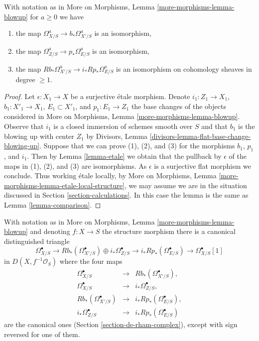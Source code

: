 \begin{lemma}
\label{lemma-comparison-general}
With notation as in More on Morphisms, Lemma \ref{more-morphisms-lemma-blowup}
for $a \geq 0$ we have
\begin{enumerate}
\item the map
$\Omega^a_{X/S} \to b_*\Omega^a_{X'/S}$ is an isomorphism,
\item the map $\Omega^a_{Z/S} \to p_*\Omega^a_{E/S}$ is an isomorphism,
\item the map $Rb_*\Omega^a_{X'/S} \to i_*Rp_*\Omega^a_{E/S}$ is an isomorphism
on cohomology sheaves in degree $\geq 1$.
\end{enumerate}
\end{lemma}

\begin{proof}
Let $\epsilon : X_1 \to X$ be a surjective \'etale morphism. Denote
$i_1 : Z_1 \to X_1$, $b_1 : X'_1 \to X_1$, $E_1 \subset X'_1$, and
$p_1 : E_1 \to Z_1$ the base changes of the objects considered in
More on Morphisms, Lemma \ref{more-morphisms-lemma-blowup}.
Observe that $i_1$ is a closed immersion
of schemes smooth over $S$ and that $b_1$ is the blowing up with center
$Z_1$ by Divisors, Lemma \ref{divisors-lemma-flat-base-change-blowing-up}.
Suppose that we can prove (1), (2), and (3)
for the morphisms $b_1$, $p_1$, and $i_1$. Then by
Lemma \ref{lemma-etale} we obtain that the pullback by $\epsilon$
of the maps in (1), (2), and (3) are isomorphisms. As $\epsilon$
is a surjective flat morphism we conclude.
Thus working \'etale locally, by
More on Morphisms, Lemma \ref{more-morphisms-lemma-etale-local-structure},
we may assume we are in the situation discussed in
Section \ref{section-calculations}. In this case the lemma
is the same as Lemma \ref{lemma-comparison}.
\end{proof}

\begin{lemma}
\label{lemma-distinguished-triangle-blowup}
With notation as in More on Morphisms, Lemma \ref{more-morphisms-lemma-blowup}
and denoting $f : X \to S$ the structure morphism there is a canonical
distinguished triangle
$$
\Omega^\bullet_{X/S} \to
Rb_*(\Omega^\bullet_{X'/S}) \oplus i_*\Omega^\bullet_{Z/S} \to
i_*Rp_*(\Omega^\bullet_{E/S}) \to
\Omega^\bullet_{X/S}[1]
$$
in $D(X, f^{-1}\mathcal{O}_S)$ where the four maps
$$
\begin{matrix}
\Omega^\bullet_{X/S} & \to & Rb_*(\Omega^\bullet_{X'/S}), \\
\Omega^\bullet_{X/S} & \to & i_*\Omega^\bullet_{Z/S}, \\
Rb_*(\Omega^\bullet_{X'/S}) & \to & i_*Rp_*(\Omega^\bullet_{E/S}), \\
i_*\Omega^\bullet_{Z/S} & \to & i_*Rp_*(\Omega^\bullet_{E/S})
\end{matrix}
$$
are the canonical ones (Section \ref{section-de-rham-complex}),
except with sign reversed for one of them.
\end{lemma}

